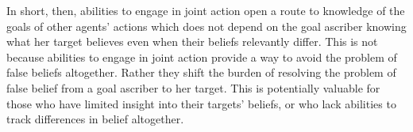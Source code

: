 \documentclass[12pt,a4paper]{extarticle}
\begin{document}
In short, then, abilities to engage in joint action open a route to knowledge of the goals of other agents' actions which does not depend on the goal ascriber knowing what her target believes even when their beliefs relevantly differ.
This is not because abilities to engage in joint action provide a way to avoid the problem of false beliefs altogether.
Rather they shift the burden of resolving the problem of false belief from a goal ascriber to her target.
This is potentially valuable for those who have limited insight into their targets' beliefs,
or who lack abilities to track differences in belief altogether.

\end{document}
